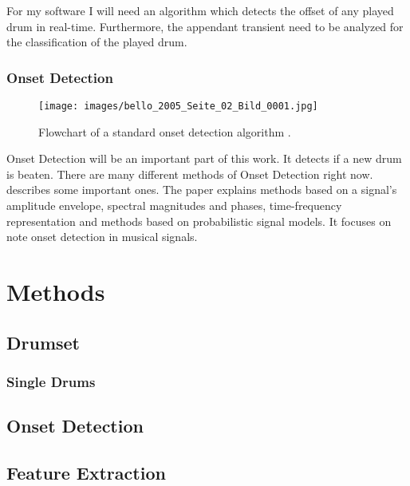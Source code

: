 For my software I will need an algorithm which detects the offset of any played drum in real-time. Furthermore, the appendant transient need to be analyzed for the classification of the played drum.

\subsubsection{Onset Detection}

\begin{figure}[h]
	\centering
	\texttt{[image: images/bello\_2005\_Seite\_02\_Bild\_0001.jpg]}
	\label{}
	\caption{Flowchart of a standard onset detection algorithm \autocite[Fig. 2]{Bello:2005}.}
	\label{fig:StandardOnsetDetection}
\end{figure}

Onset Detection will be an important part of this work. It detects if a new drum is beaten.
There are many different methods of Onset Detection right now. \autocite[]{Bello:2005} describes some important ones. The paper explains methods based on a signal's amplitude envelope, spectral magnitudes and phases, time-frequency representation and methods based on probabilistic signal models. It focuses on note onset detection in musical signals.


\section{Methods}

\subsection{Drumset}

\subsubsection{Single Drums}

\subsection{Onset Detection}

\subsection{Feature Extraction}

